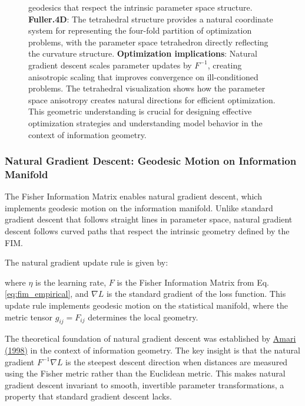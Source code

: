 \documentclass[
  10pt,
]{article}
\begin{document}
\begin{figure}
{geodesics that respect the intrinsic parameter space structure.
\textbf{Fuller.4D}: The tetrahedral structure provides a natural
coordinate system for representing the four-fold partition of
optimization problems, with the parameter space tetrahedron directly
reflecting the curvature structure. \textbf{Optimization implications}:
Natural gradient descent scales parameter updates by \(F^{-1}\),
creating anisotropic scaling that improves convergence on
ill-conditioned problems. The tetrahedral visualization shows how the
parameter space anisotropy creates natural directions for efficient
optimization. This geometric understanding is crucial for designing
effective optimization strategies and understanding model behavior in
the context of information geometry.}
\end{figure}

\hypertarget{natural-gradient-descent-geodesic-motion-on-information-manifold}{%
\subsubsection{Natural Gradient Descent: Geodesic Motion on Information
Manifold}\label{natural-gradient-descent-geodesic-motion-on-information-manifold}}

The Fisher Information Matrix enables natural gradient descent, which
implements geodesic motion on the information manifold. Unlike standard
gradient descent that follows straight lines in parameter space, natural
gradient descent follows curved paths that respect the intrinsic
geometry defined by the FIM.

The natural gradient update rule is given by:

where \(\eta\) is the learning rate, \(F\) is the Fisher Information
Matrix from Eq. \eqref{eq:fim_empirical}, and \(\nabla L\) is the
standard gradient of the loss function. This update rule implements
geodesic motion on the statistical manifold, where the metric tensor
\(g_{ij} = F_{ij}\) determines the local geometry.

The theoretical foundation of natural gradient descent was established
by \href{https://en.wikipedia.org/wiki/Natural_gradient}{Amari (1998)}
in the context of information geometry. The key insight is that the
natural gradient \(F^{-1}\nabla L\) is the steepest descent direction
when distances are measured using the Fisher metric rather than the
Euclidean metric. This makes natural gradient descent invariant to
smooth, invertible parameter transformations, a property that standard
gradient descent lacks.
\end{document}

